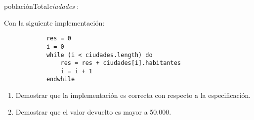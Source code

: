 \documentclass[10pt,a4paper]{article}
\begin{document}
\vspace{2mm}


 \begin{proc}{poblaciónTotal}{\In \textit{ciudades} : }{\ent}
	\vspace{1.5mm}
	

\end{proc}

\vspace{2mm}

Con la siguiente implementación:

\begin{verbatim}
            res = 0
            i = 0
            while (i < ciudades.length) do
                res = res + ciudades[i].habitantes
                i = i + 1
            endwhile
\end{verbatim}

\begin{enumerate}
    \item Demostrar que la implementación es correcta con respecto a la especificación.
    \item Demostrar que el valor devuelto es mayor a 50.000.
\end{enumerate}

\subsection{}
\subsection{}
\end{document}
